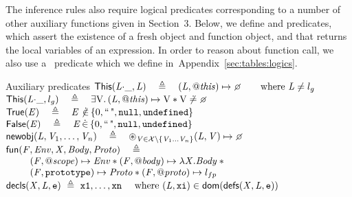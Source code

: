 \documentclass{article}
\newcommand{\iflong}[1]{#1}
\newcommand{\ifshort}[1]{}
\begin{document}
The inference rules %
also require logical predicates corresponding to a number of other auxiliary functions given in Section~3. 
%
Below, we define \newobj and \func predicates, which assert the existence of a fresh object and function object, and \vardecls that returns the local variables of an expression.
%
In order to reason about function call, we also use a \ predicate  which we define  in~\ifshort{\cite{proofs}}\iflong{Appendix~\ref{sec:tables:logics}}.

%
\begin{display}{Auxiliary predicates}
$\pickThis(\E{L}\sv\_,\E{L}) ~~~\triangleq~~~ (\E{L},\thisp)\pointsto\none\qquad\text{where }\E{L}\neq\lgo$\\
$\pickThis(\E{L}\sv\_,\lgo) ~~~\triangleq~~~ \exists\V{V}\st(\E{L},\thisp)\pointsto\V{V}\sep\V{V}\not\doteq\none$\\[\gap]
%
$\mathsf{True}({\mathit{E}}) ~~~\triangleq~~~ {\mathit{E}}\not\!\!\mbox{$\,\dot{\in}\,$} \{0,\text{``\,"},\mbox{\texttt{{\upshape null}}},\mbox{\texttt{{\upshape undefined}}}\}$\\
$\mathsf{False}({\mathit{E}}) ~~~\triangleq~~~ {\mathit{E}}\mbox{$\,\dot{\in}\,$} \{0,\text{``\,"},\mbox{\texttt{{\upshape null}}},\mbox{\texttt{{\upshape undefined}}}\}$\\
%
$\newobj(\E{L},\E{V}_1,\dots,\E{V}_n) ~~~\triangleq~~~ \bigsep_{\E{V} \in \vars\setminus\{\E{V}_1\dots\E{V}_n\}} (\E{L},\E{V}) \pointsto\none$\\[\gap]
%
$\begin{array}{l}
        \hspace{-5pt}\mathsf{fun}({\mathit{F}},{\mathit{Env}},{\mathit{X}},{\mathit{Body}},{\mathit{Proto}}) ~~~\triangleq
        \\ \qquad 
                ({\mathit{F}},\mathit{@scope})\mapsto {\ensuremath{\mathit{Env}}} \mathbin{*}
                ({\mathit{F}},\mathit{@body} )\mapsto \lambda{\ensuremath{\mathit{X}}}.{\mathit{Body}} \mathbin{*}{}\\
        \qquad  ({\mathit{F}},\mbox{\texttt{{\upshape prototype}}} )\mapsto {\ensuremath{\mathit{Proto}}} \mathbin{*}
                ({\mathit{F}},\mathit{@proto} )\mapsto l_{fp}
\end{array}$\\[\gap]
%
$\mathsf{decls}({\mathit{X}},{\mathit{L}},\mbox{\texttt{{\upshape e}}}) ~\triangleq~ \mbox{\texttt{{\upshape x1}}},\ldots,\mbox{\texttt{{\upshape xn}}}\quad\text{ where }({\mathit{L}},\mbox{\texttt{{\upshape xi}}})\in\mathsf{dom}(\mathsf{defs}({\mathit{X}},{\mathit{L}},\mbox{\texttt{{\upshape e}}}))$
%
\end{display}
\end{document}
